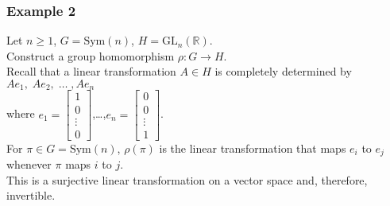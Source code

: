 \documentclass[11pt]{article}
\newcommand{\0}{\emptyset}
\newcommand{\R}{\mathbb{R}}
\begin{document}
\subsubsection*{Example 2}
\label{sec:org351d3a3}
Let \(n\geq1\), \(G=\text{Sym}(n)\), \(H=\text{GL}_{n}(\R)\).\\[0pt]
Construct a group homomorphism \(\rho:G\to H\).\\[0pt]
Recall that a linear transformation \(A\in H\) is completely determined by \(Ae_{1},\;Ae_{2},\;\ldots\;,Ae_{n}\)\\[0pt]
where \(e_{1}=\begin{bmatrix}1 \\ 0 \\ \vdots \\ 0 \end{bmatrix}\),\ldots{},\(e_{n}=\begin{bmatrix}0 \\ 0 \\ \vdots \\ 1 \end{bmatrix}\).\\[0pt]
For \(\pi\in G=\text{Sym}(n)\), \(\rho(\pi)\) is the linear transformation that maps \(e_{i}\) to \(e_{j}\) whenever \(\pi\) maps \(i\) to \(j\).\\[0pt]
This is a surjective linear transformation on a vector space and, therefore, invertible.\\[0pt]
\end{document}
